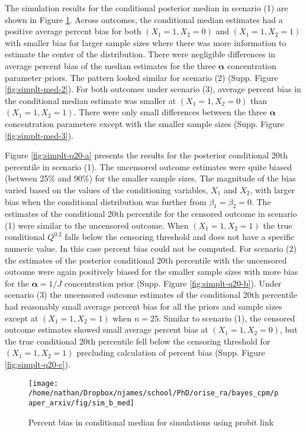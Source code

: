 \documentclass[
]{article}
\begin{document}
The simulation results for the conditional posterior median in scenario (1) are shown in Figure \ref{fig:simplt-med-1}. Across outcomes, the conditional median estimates had a positive average percent bias for both \((X_1=1,X_2=0)\) and \((X_1=1,X_2=1)\) with smaller bias for larger sample sizes where there was more information to estimate the center of the distribution. There were negligible differences in average percent bias of the median estimates for the three \(\boldsymbol{\alpha}\) concentration parameter priors. The pattern looked similar for scenario (2) (Supp. Figure \ref{fig:simplt-med-2}). For both outcomes under scenario (3), average percent bias in the conditional median estimate was smaller at \((X_1=1,X_2=0)\) than \((X_1=1,X_2=1)\). There were only small differences between the three \(\boldsymbol{\alpha}\) concentration parameters except with the smaller sample sizes (Supp. Figure \ref{fig:simplt-med-3}).

Figure \ref{fig:simplt-q20-a} presents the results for the posterior conditional 20th percentile in scenario (1). The uncensored outcome estimates were quite biased (between 25\% and 90\%) for the smaller sample sizes. The magnitude of the bias varied based on the values of the conditioning variables, \(X_1\) and \(X_2\), with larger bias when the conditional distribution was further from \(\beta_1 = \beta_2 = 0\). The estimates of the conditional 20th percentile for the censored outcome in scenario (1) were similar to the uncensored outcome. When \((X_1=1,X_2=1)\) the true conditional \(Q^{0.2}\) falls below the censoring threshold and does not have a specific numeric value. In this case percent bias could not be computed. For scenario (2) the estimates of the posterior conditional 20th percentile with the uncensored outcome were again positively biased for the smaller sample sizes with more bias for the \(\boldsymbol{\alpha}=1/J\) concentration prior (Supp. Figure \ref{fig:simplt-q20-b}). Under scenario (3) the uncensored outcome estimates of the conditional 20th percentile had reasonably small average percent bias for all the priors and sample sizes except at \((X_1=1,X_2=1)\) when \(n=25\). Similar to scenario (1), the censored outcome estimates showed small average percent bias at \((X_1=1,X_2=0)\), but the true conditional 20th percentile fell below the censoring threshold for \((X_1=1,X_2=1)\) precluding calculation of percent bias (Supp. Figure \ref{fig:simplt-q20-c}).

\begin{figure}

{\centering \texttt{[image: /home/nathan/Dropbox/njames/school/PhD/orise\_ra/bayes\_cpm/paper\_arxiv/fig/sim\_b\_med]} 

}

\caption{Percent bias in conditional median for simulations using probit link}\label{fig:simplt-med-1}
\end{figure}
\end{document}
